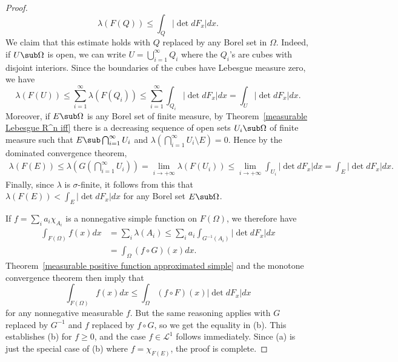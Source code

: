 \begin{proof}
\[\lambda(F(Q))\leq\int_Q|\det dF_x|dx.\]
We claim that this estimate holds with $Q$ replaced by any Borel set in $\Omega$. Indeed, if $U\sub\Omega$ is open, we can write $U=\bigcup_{i=1}^{\infty}Q_i$ where the $Q_i$'s are cubes with disjoint interiors. Since the boundaries of the cubes have Lebesgue measure zero, we have 
\[\lambda(F(U))\leq\sum_{i=1}^{\infty}\lambda(F(Q_i))\leq\sum_{i=1}^{\infty}\int_{Q_i}|\det dF_x|dx=\int_U|\det dF_x|dx.\]
Moreover, if $E\sub\Omega$ is any Borel set of finite measure, by Theorem~\ref{measurable Lebesgue R^n iff} there is a decreasing sequence of open sets $U_i\sub\Omega$ of finite measure such that $E\sub\bigcap_{i=1}^{\infty}U_i$ and $\lambda(\bigcap_{i=1}^{\infty}U_i\setminus E)=0$. Hence by the dominated convergence theorem,
\begin{align*}
\lambda(F(E))\leq\lambda(G(\bigcap_{i=1}^{\infty}U_i))=\lim_{i\to+\infty}\lambda(F(U_i))\leq\lim_{i\to+\infty}\int_{U_i}|\det dF_x|dx=\int_E|\det dF_x|dx.
\end{align*}
Finally, since $\lambda$ is $\sigma$-finite, it follows from this that $\lambda(F(E))<\int_E|\det dF_x|dx$ for any Borel set $E\sub\Omega$.\par
If $f=\sum_ia_i\chi_{A_i}$ is a nonnegative simple function on $F(\Omega)$, we therefore have
\begin{align*}
\int_{F(\Omega)}f(x)dx&=\sum_i\lambda(A_i)\leq\sum_ia_i\int_{G^{-1}(A_i)}|\det dF_x|dx\\
&=\int_{\Omega}(f\circ G)(x)dx.
\end{align*}
Theorem~\ref{measurable positive function approximated simple} and the monotone convergence theorem then imply that
\[\int_{F(\Omega)}f(x)dx\leq\int_{\Omega}(f\circ F)(x)|\det dF_x|dx\]
for any nonnegative measurable $f$. But the same reasoning applies with $G$ replaced by $G^{-1}$ and $f$ replaced by $f\circ G$, so we get the equality in (b). This establishes (b) for $f \geq 0$, and the case $f\in\mathcal{L}^1$ follows immediately. Since (a) is just the special case of (b) where $f=\chi_{F(E)}$, the proof is complete.
\end{proof}
